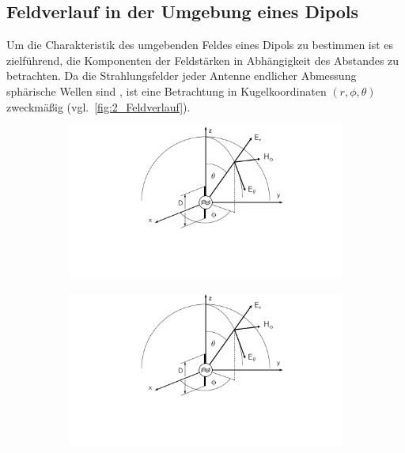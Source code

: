 \subsection{Feldverlauf in der Umgebung eines Dipols}\label{cha:2_sub_Feldverlauf_in_Umgebung_eines_Dipols}

Um die Charakteristik des umgebenden Feldes eines Dipols zu bestimmen ist es zielführend, die Komponenten der Feldstärken in Abhängigkeit des Abstandes zu betrachten. Da die Strahlungsfelder jeder Antenne endlicher Abmessung sphärische Wellen sind \cite{Antenna_Theory}, ist eine Betrachtung in Kugelkoordinaten $\left(r, \phi, \theta\right)$ zweckmäßig (vgl.~\Abb \ref{fig:2_Feldverlauf}). 

\begin{figure}
    \centering
    \begin{subfigure}[b]{0.4\textwidth}
        \includegraphics[page = 1, height=0.2\textheight, trim = 8.5cm 5cm 7cm 0cm, clip]{Abbildungen/Kapitel2/Hertz'scher_Dipol.pdf}
        \caption{\label{subfig:2_Feldverlauf_Koordinatensystem}}
    \end{subfigure}
    \hspace{1cm}
    \begin{subfigure}[b]{0.4\textwidth}
        \includegraphics[page = 2, height=0.2\textheight, trim = 8.5cm 3cm 7cm 2cm, clip]{Abbildungen/Kapitel2/Hertz'scher_Dipol.pdf}

\end{subfigure}
\end{figure}
